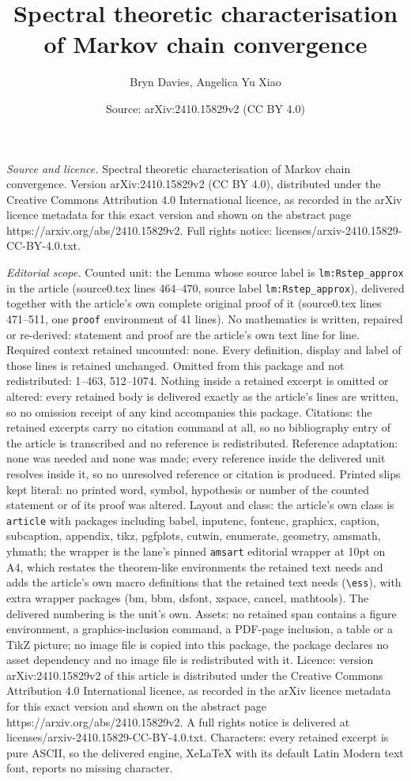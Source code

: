 \documentclass[10pt,a4paper]{amsart}
\title[Spectral theoretic characterisation of Markov chain converge]{Spectral theoretic characterisation of Markov chain convergence}
\author{Bryn Davies, Angelica Yu Xiao}
\date{Source: arXiv:2410.15829v2 (CC BY 4.0)}
\begin{document}
\maketitle

\noindent\emph{Source and licence.} Spectral theoretic characterisation of Markov chain convergence. Version arXiv:2410.15829v2 (CC BY 4.0), distributed under the Creative Commons Attribution 4.0 International licence, as recorded in the arXiv licence metadata for this exact version and shown on the abstract page https://arxiv.org/abs/2410.15829v2. Full rights notice: licenses/arxiv-2410.15829-CC-BY-4.0.txt.\par\smallskip

\noindent\textit{Editorial scope.} Counted unit: the Lemma whose source label is \texttt{lm:Rstep\_approx} in the article (source0.tex lines 464--470, source label \texttt{lm:Rstep\_approx}), delivered together with the article's own complete original proof of it (source0.tex lines 471--511, one \texttt{proof} environment of 41 lines). No mathematics is written, repaired or re-derived: statement and proof are the article's own text line for line. Required context retained uncounted: none. Every definition, display and label of those lines is retained unchanged. Omitted from this package and not redistributed: 1--463, 512--1074. Nothing inside a retained excerpt is omitted or altered: every retained body is delivered exactly as the article's lines are written, so no omission receipt of any kind accompanies this package. Citations: the retained excerpts carry no citation command at all, so no bibliography entry of the article is transcribed and no reference is redistributed. Reference adaptation: none was needed and none was made; every reference inside the delivered unit resolves inside it, so no unresolved reference or citation is produced. Printed slips kept literal: no printed word, symbol, hypothesis or number of the counted statement or of its proof was altered. Layout and class: the article's own class is \texttt{article} with packages including babel, inputenc, fontenc, graphicx, caption, subcaption, appendix, tikz, pgfplots, cutwin, enumerate, geometry, amsmath, yhmath; the wrapper is the lane's pinned \texttt{amsart} editorial wrapper at 10pt on A4, which restates the theorem-like environments the retained text needs and adds the article's own macro definitions that the retained text needs (\texttt{\textbackslash ess}), with extra wrapper packages (bm, bbm, dsfont, xspace, cancel, mathtools). The delivered numbering is the unit's own. Assets: no retained span contains a figure environment, a graphics-inclusion command, a PDF-page inclusion, a table or a TikZ picture; no image file is copied into this package, the package declares no asset dependency and no image file is redistributed with it. Licence: version arXiv:2410.15829v2 of this article is distributed under the Creative Commons Attribution 4.0 International licence, as recorded in the arXiv licence metadata for this exact version and shown on the abstract page https://arxiv.org/abs/2410.15829v2. A full rights notice is delivered at licenses/arxiv-2410.15829-CC-BY-4.0.txt. Characters: every retained excerpt is pure ASCII, so the delivered engine, XeLaTeX with its default Latin Modern text font, reports no missing character.
\end{document}
